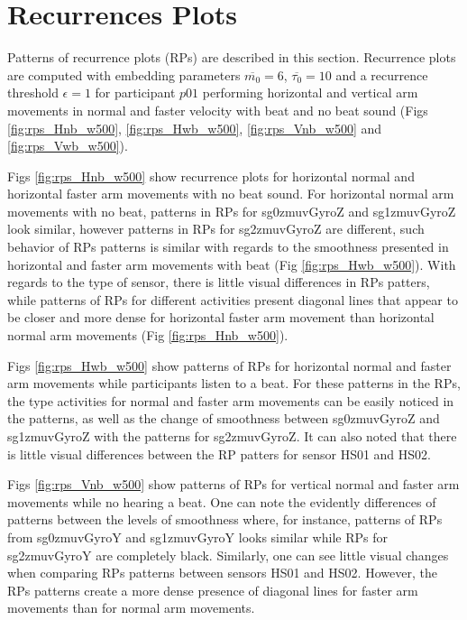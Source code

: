 \newpage
\section{Recurrences Plots}
Patterns of recurrence plots (RPs) are described in this section.
Recurrence plots are computed with embedding parameters 
$\overline{m_0}=6$, $\overline{\tau_0}=10$ and a recurrence 
threshold $\epsilon=1$ for participant $p01$ performing horizontal 
and vertical arm movements in normal and faster velocity 
with beat and no beat sound (Figs \ref{fig:rps_Hnb_w500}, 
\ref{fig:rps_Hwb_w500}, \ref{fig:rps_Vnb_w500} and \ref{fig:rps_Vwb_w500}).

Figs \ref{fig:rps_Hnb_w500} show recurrence plots for horizontal normal
and horizontal faster arm movements with no beat sound. 
For horizontal normal arm movements with no beat, patterns in 
RPs for sg0zmuvGyroZ and sg1zmuvGyroZ look similar, however
patterns in RPs for sg2zmuvGyroZ are different,
such behavior of RPs patterns is similar with regards to the smoothness 
presented in horizontal and faster arm movements with beat
(Fig \ref{fig:rps_Hwb_w500}).
With regards to the type of sensor, there is little visual differences in 
RPs patters, while patterns of RPs for different activities present diagonal 
lines that appear to be closer and more dense for horizontal faster 
arm movement than horizontal normal arm movements (Fig \ref{fig:rps_Hnb_w500}).

Figs \ref{fig:rps_Hwb_w500} show patterns of RPs for horizontal normal
and faster arm movements while participants listen to a beat. 
For these patterns in the RPs, the type activities for normal and 
faster arm movements can be easily noticed in the patterns,
as well as the change of smoothness between sg0zmuvGyroZ and sg1zmuvGyroZ
with the patterns for sg2zmuvGyroZ. It can also noted that there is 
little visual differences between the RP patters for sensor HS01 and HS02.

Figs \ref{fig:rps_Vnb_w500} show patterns of RPs for vertical normal
and faster arm movements while no hearing a beat. One can note
the evidently differences of patterns between the levels of smoothness 
where, for instance, patterns of RPs from sg0zmuvGyroY and sg1zmuvGyroY 
looks similar while RPs for sg2zmuvGyroY are completely black.
Similarly, one can see little visual changes when comparing RPs patterns 
between sensors HS01 and HS02. 
However, the RPs patterns create a more dense presence of diagonal lines
for faster arm movements than for normal arm movements. 

